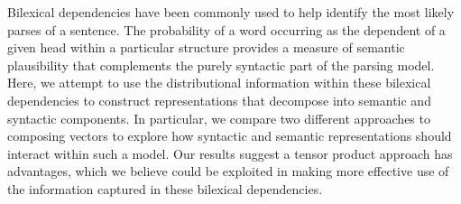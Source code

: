 Bilexical dependencies have been commonly used to help identify the most likely parses of a sentence. The probability of a word occurring as the dependent of a given head within a particular structure provides a measure of semantic plausibility that complements the purely syntactic part of the parsing model. Here, we attempt to use the distributional information within these bilexical dependencies to construct representations that decompose into semantic and syntactic components. In particular, we compare two different approaches to composing vectors to explore how syntactic and semantic representations should interact within such a model. Our results suggest a tensor product approach has advantages, which we believe could be exploited in making more effective use of the information captured in these bilexical dependencies.
